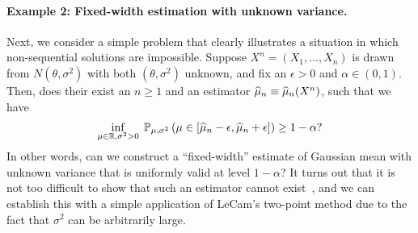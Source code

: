 \documentclass[12pt]{article}
\begin{document}
\paragraph{Example 2: Fixed-width estimation with unknown variance.} Next, we consider a simple problem that clearly illustrates a situation in which non-sequential solutions are impossible. Suppose $X^n = (X_1, \ldots, X_n)$ is drawn \iid from $N(\theta, \sigma^2)$ with both $(\theta, \sigma^2)$ unknown, and fix an $\epsilon >0$ and $\alpha \in (0,1)$. Then, does their exist an $n \geq 1$ and an estimator $\widehat{\mu}_n \equiv \widehat{\mu}_n(X^n)$, such that we have 
\begin{align}
    \inf_{\mu\in \mathbb{R}, \sigma^2 > 0} \; \mathbb{P}_{\mu, \sigma^2} \left( \mu \in [\widehat{\mu}_n - \epsilon,  \widehat{\mu}_n + \epsilon] \right) \geq 1-\alpha?  \label{eq:fixed-width-estimation}
\end{align}
In other words, can we construct a ``fixed-width'' estimate of Gaussian mean with unknown variance that is uniformly valid  at level $1-\alpha$? It turns out that it is not too difficult to show that such an estimator cannot exist~\citep{dantzig1940non}, and we can establish this with a simple application of LeCam's two-point method due to the fact that $\sigma^2$ can be arbitrarily large.  
\end{document}
